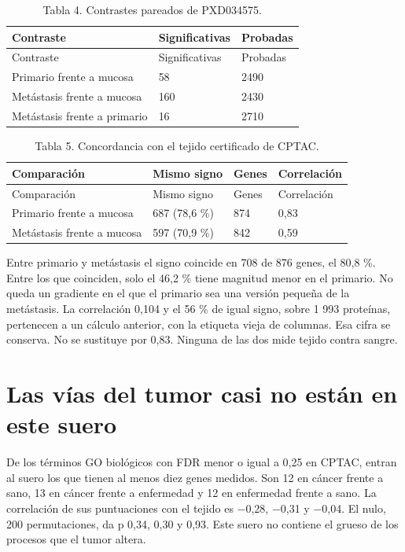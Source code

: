 \documentclass[12pt,oneside]{report}
\begin{document}
\begin{longtable}{p{5.17cm} p{5.17cm} p{5.17cm}}
\caption{Tabla 4. Contrastes pareados de PXD034575.}\\
\toprule
Contraste & Significativas & Probadas\\
\midrule
\endfirsthead
\toprule
Contraste & Significativas & Probadas\\
\midrule
\endhead
Primario frente a mucosa & 58 & 2490\\
Metástasis frente a mucosa & 160 & 2430\\
Metástasis frente a primario & 16 & 2710\\
\bottomrule
\end{longtable}
\begin{longtable}{p{3.88cm} p{3.88cm} p{3.88cm} p{3.88cm}}
\caption{Tabla 5. Concordancia con el tejido certificado de CPTAC.}\\
\toprule
Comparación & Mismo signo & Genes & Correlación\\
\midrule
\endfirsthead
\toprule
Comparación & Mismo signo & Genes & Correlación\\
\midrule
\endhead
Primario frente a mucosa & 687 (78,6 \%) & 874 & 0,83\\
Metástasis frente a mucosa & 597 (70,9 \%) & 842 & 0,59\\
\bottomrule
\end{longtable}
Entre primario y metástasis el signo coincide en 708 de 876 genes, el 80,8 \%. Entre los que coinciden, solo el 46,2 \% tiene magnitud menor en el primario. No queda un gradiente en el que el primario sea una versión pequeña de la metástasis. La correlación 0,104 y el 56 \% de igual signo, sobre 1 993 proteínas, pertenecen a un cálculo anterior, con la etiqueta vieja de columnas. Esa cifra se conserva. No se sustituye por 0,83. Ninguna de las dos mide tejido contra sangre.

\section{Las vías del tumor casi no están en este suero}
De los términos GO biológicos con FDR menor o igual a 0,25 en CPTAC, entran al suero los que tienen al menos diez genes medidos. Son 12 en cáncer frente a sano, 13 en cáncer frente a enfermedad y 12 en enfermedad frente a sano. La correlación de sus puntuaciones con el tejido es −0,28, −0,31 y −0,04. El nulo, 200 permutaciones, da p 0,34, 0,30 y 0,93. Este suero no contiene el grueso de los procesos que el tumor altera.
\end{document}
